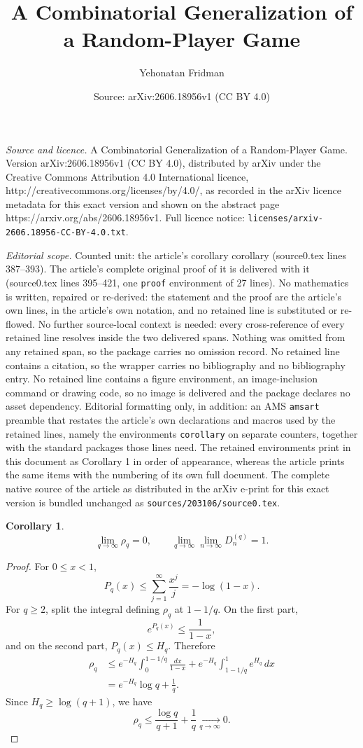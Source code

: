 \documentclass[10pt,a4paper]{amsart}
\title{A Combinatorial Generalization of a Random-Player Game}
\author{Yehonatan Fridman}
\date{Source: arXiv:2606.18956v1 (CC BY 4.0)}
\newtheorem{corollary}{Corollary}
\begin{document}
\maketitle

\noindent\emph{Source and licence.} A Combinatorial Generalization of a Random-Player Game. Version arXiv:2606.18956v1 (CC BY 4.0), distributed by arXiv under the Creative Commons Attribution 4.0 International licence, http://creativecommons.org/licenses/by/4.0/, as recorded in the arXiv licence metadata for this exact version and shown on the abstract page https://arxiv.org/abs/2606.18956v1. Full licence notice: \texttt{licenses/arxiv-2606.18956-CC-BY-4.0.txt}.\par\smallskip

\noindent\textit{Editorial scope.} Counted unit: the article's corollary corollary (source0.tex lines 387--393). The article's complete original proof of it is delivered with it (source0.tex lines 395--421, one \texttt{proof} environment of 27 lines). No mathematics is written, repaired or re-derived: the statement and the proof are the article's own lines, in the article's own notation, and no retained line is substituted or re-flowed.  No further source-local context is needed: every cross-reference of every retained line resolves inside the two delivered spans.  Nothing was omitted from any retained span, so the package carries no omission record.  No retained line contains a citation, so the wrapper carries no bibliography and no bibliography entry.  No retained line contains a figure environment, an image-inclusion command or drawing code, so no image is delivered and the package declares no asset dependency.  Editorial formatting only, in addition: an AMS \texttt{amsart} preamble that restates the article's own declarations and macros used by the retained lines, namely the environments \texttt{corollary} on separate counters, together with the standard packages those lines need.  The retained environments print in this document as Corollary 1 in order of appearance, whereas the article prints the same items with the numbering of its own full document.  The complete native source of the article as distributed in the arXiv e-print for this exact version is bundled unchanged as \texttt{sources/203106/source0.tex}.
\begin{corollary}
\[
    \lim_{q\to\infty}\rho_q=0,
    \qquad
    \lim_{q\to\infty}\lim_{n\to\infty}D_n^{(q)}=1.
\]
\end{corollary}

\begin{proof}
For $0\le x<1$,
\[
    P_q(x)\le \sum_{j=1}^{\infty}\frac{x^j}{j}=-\log(1-x).
\]
For $q\ge2$, split the integral defining $\rho_q$ at $1-1/q$. On the first
part,
\[
    e^{P_q(x)}\le \frac{1}{1-x},
\]
and on the second part, $P_q(x)\le H_q$. Therefore
\[
\begin{aligned}
    \rho_q
    &\le
    e^{-H_q}\int_0^{1-1/q}\frac{dx}{1-x}
    +
    e^{-H_q}\int_{1-1/q}^{1}e^{H_q}\,dx \\
    &=
    e^{-H_q}\log q+\frac{1}{q}.
\end{aligned}
\]
Since $H_q\ge \log(q+1)$, we have
\[
    \rho_q\le \frac{\log q}{q+1}+\frac{1}{q}\xrightarrow[q\to\infty]{}0.
\]
\end{proof}
\end{document}

